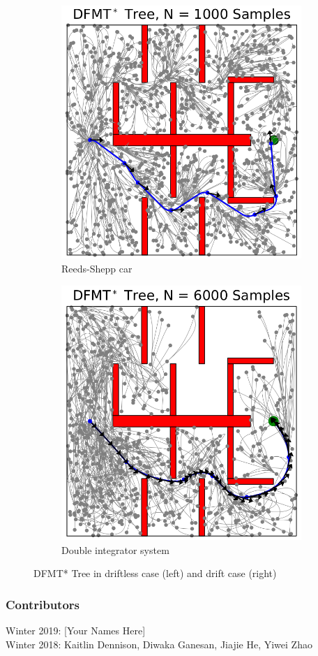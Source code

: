 \documentclass[twoside]{article}
\begin{document}
\begin{figure}[h!]
    \centering
    \begin{subfigure}[b]{0.4\linewidth}
      \includegraphics[width=\linewidth]{driftless.png}
      \caption{Reeds-Shepp car}
    \end{subfigure}
    \begin{subfigure}[b]{0.4\linewidth}
      \includegraphics[width=\linewidth]{drift.png}
      \caption{Double integrator system}
    \end{subfigure}
    \caption{DFMT* Tree in driftless case (left) and drift case (right)}
    \label{fig:kino}
  \end{figure}

\subsubsection*{Contributors}
Winter 2019: [Your Names Here]
\\
Winter 2018: Kaitlin Dennison, Diwaka Ganesan, Jiajie He, Yiwei Zhao
\end{document}
